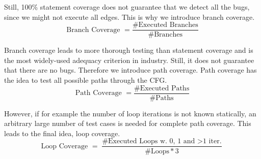 Still, 100\% statement coverage does not guarantee that we detect all the bugs, since we might not execute all edges. This is why we introduce branch coverage.
$$\text{Branch Coverage } = \frac{\text{\#Executed Branches}}{\text{\#Branches}}$$

Branch coverage leads to more thorough testing than statement coverage and is the most widely-used adequacy criterion in industry. Still, it does not guarantee that there are no bugs. Therefore we introduce path coverage. Path coverage has the idea to test all possible paths through the CFG.
$$\text{Path Coverage } = \frac{\text{\#Executed Paths}}{\text{\#Paths}}$$

However, if for example the number of loop iterations is not known statically, an arbitrary large number of test cases is needed for complete path coverage. This leads to the final idea, loop coverage.
$$\text{Loop Coverage } = \frac{\text{\#Executed Loops w. 0, 1 and $>$1 iter.}}{\text{\#Loops} * 3}$$